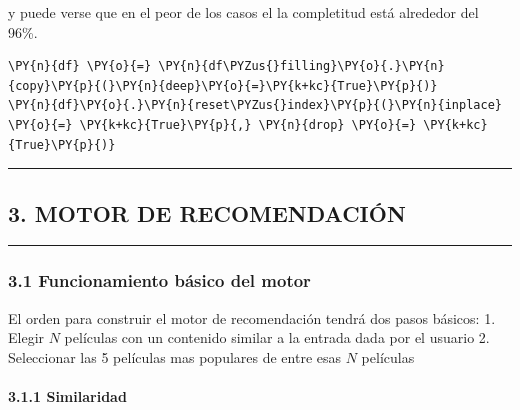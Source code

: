     y puede verse que en el peor de los casos el la completitud está
alrededor del 96\%.

    \begin{tcolorbox}[breakable, size=fbox, boxrule=1pt, pad at break*=1mm,colback=cellbackground, colframe=cellborder]
\begin{Verbatim}[commandchars=\\\{\}]
\PY{n}{df} \PY{o}{=} \PY{n}{df\PYZus{}filling}\PY{o}{.}\PY{n}{copy}\PY{p}{(}\PY{n}{deep}\PY{o}{=}\PY{k+kc}{True}\PY{p}{)}
\PY{n}{df}\PY{o}{.}\PY{n}{reset\PYZus{}index}\PY{p}{(}\PY{n}{inplace} \PY{o}{=} \PY{k+kc}{True}\PY{p}{,} \PY{n}{drop} \PY{o}{=} \PY{k+kc}{True}\PY{p}{)}
\end{Verbatim}
\end{tcolorbox}

    \begin{center}\rule{0.5\linewidth}{\linethickness}\end{center}

\subsection{3. MOTOR DE RECOMENDACIÓN}\label{motor-de-recomendaciuxf3n}

    \begin{center}\rule{0.5\linewidth}{\linethickness}\end{center}

\subsubsection{3.1 Funcionamiento básico del
motor}\label{funcionamiento-buxe1sico-del-motor}

El orden para construir el motor de recomendación tendrá dos pasos
básicos: 1. Elegir \(N\) películas con un contenido similar a la entrada
dada por el usuario 2. Seleccionar las 5 películas mas populares de
entre esas \(N\) películas

\paragraph{3.1.1 Similaridad}\label{similaridad}

